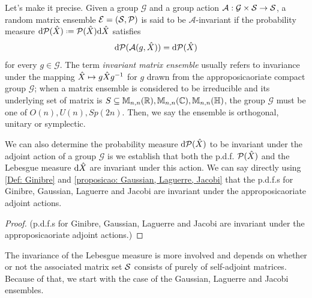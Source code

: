 Let's make it precise. Given a group $\mathcal{G}$ and a group action $\mathcal{A}: \mathcal{G}\times \mathcal{S} \rightarrow \mathcal{S}$, a random matrix ensemble $\mathcal{E} = (\mathcal{S}, \mathcal{P})$ is said to be $\mathcal{A}$-invariant if the probability measure $\dd \eP(\m{X}) \deff \eP(\m{X}) \dd \m{X}$ satisfies
\begin{equation}
	\mathrm{d} \mathcal{P}(\mathcal{A}(g, \hat X)) = \mathrm{d} \mathcal{P}(\hat X)
\end{equation}
for every $g \in \mathcal{G}$. The term \textit{invariant matrix ensemble} usually refers to invariance under the mapping $\hat X \mapsto g\hat Xg^{-1}$ for $g$ drawn from the approposicaoriate compact group $\mathcal{G}$; when a matrix ensemble is considered to be irreducible and its underlying set of matrix is $S \subseteq \mathbb{M}_{n,n}(\mathbb{R}), \mathbb{M}_{n,n}(\mathbb{C}), \mathbb{M}_{n,n}(\mathbb{H})$, the group $\mathcal{G}$ must be one of $O(n), U(n), Sp(2n)$. Then, we say the ensemble is orthogonal, unitary or symplectic.

We can also determine the probability measure $\mathrm{d} \mathcal{P}(\hat X)$ to be invariant under the adjoint action of a group $\mathcal{G}$ is we establish that both the p.d.f. $\mathcal{P}(\hat X)$ and the Lebesgue measure $\mathrm{d} \hat X$ are invariant under this action. We can say directly using \ref{Def: Ginibre} and \ref{proposicao: Gaussian, Laguerre, Jacobi} that the p.d.f.s for Ginibre, Gaussian, Laguerre and Jacobi are invariant under the approposicaoriate adjoint actions.

\begin{proof}
	(p.d.f.s for Ginibre, Gaussian, Laguerre and Jacobi are invariant under the approposicaoriate adjoint actions.)
\end{proof}

The invariance of the Lebesgue measure is more involved and depends on whether or not the associated matrix set $\mathcal{S}$ consists of purely of self-adjoint matrices. Because of that, we start with the case of the Gaussian, Laguerre and Jacobi ensembles.

